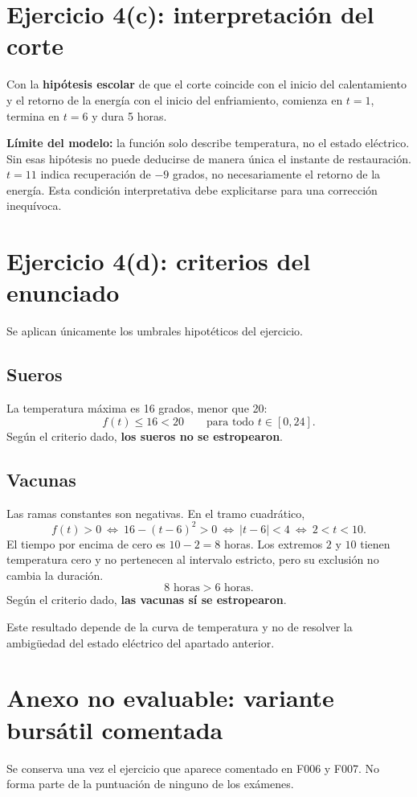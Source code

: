 \documentclass[11pt]{article}
\begin{document}
\section*{Ejercicio 4(c): interpretación del corte}
Con la \textbf{hipótesis escolar} de que el corte coincide con el inicio del calentamiento y el retorno de la energía con el inicio del enfriamiento, comienza en $t=1$, termina en $t=6$ y dura 5 horas.

\textbf{Límite del modelo:} la función solo describe temperatura, no el estado eléctrico. Sin esas hipótesis no puede deducirse de manera única el instante de restauración. $t=11$ indica recuperación de $-9$ grados, no necesariamente el retorno de la energía. Esta condición interpretativa debe explicitarse para una corrección inequívoca.
\clearpage
\section*{Ejercicio 4(d): criterios del enunciado}
Se aplican únicamente los umbrales hipotéticos del ejercicio.
\subsection*{Sueros}
La temperatura máxima es 16 grados, menor que 20:
\[f(t)\leq16<20\qquad\text{para todo }t\in[0,24].\]
Según el criterio dado, \textbf{los sueros no se estropearon}.
\subsection*{Vacunas}
Las ramas constantes son negativas. En el tramo cuadrático,
\[
f(t)>0\ \Longleftrightarrow\ 16-(t-6)^2>0
\ \Longleftrightarrow\ |t-6|<4
\ \Longleftrightarrow\ 2<t<10.
\]
El tiempo por encima de cero es $10-2=8$ horas. Los extremos $2$ y $10$ tienen temperatura cero y no pertenecen al intervalo estricto, pero su exclusión no cambia la duración.
\[\boxed{8\text{ horas}>6\text{ horas}}.\]
Según el criterio dado, \textbf{las vacunas sí se estropearon}.

Este resultado depende de la curva de temperatura y no de resolver la ambigüedad del estado eléctrico del apartado anterior.
\clearpage
\section*{Anexo no evaluable: variante bursátil comentada}
Se conserva una vez el ejercicio que aparece comentado en F006 y F007. No forma parte de la puntuación de ninguno de los exámenes.
\end{document}
